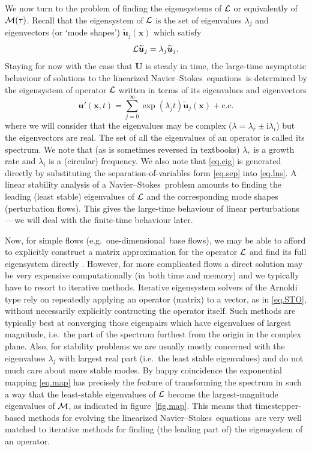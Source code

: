 \documentclass[11pt,a4paper]{report}
\newcommand\ci{\mathrm{i}}
\newcommand\wt[1]{\widetilde{#1}}
\newcommand\NavSto{Navier--Stokes}
\newcommand\LNS{linearized \NavSto}
\newcommand\LNSE{\LNS\ equations}
\newcommand\oned{one-di\-men\-sion\-al}
\newcommand{\ie}{i.e.\ }
\newcommand{\eg}{e.g.\ }
\newcommand\Ubase{{\bm{U}}}
\newcommand\upert{{\bm{u}'}}
\newcommand\xvec{\bm{x}}
\newcommand\Lop{{\cal L}}
\newcommand\Mop{{\cal M}}
\begin{document}
We now turn to the problem of finding the eigensystems of $\Lop$ or
equivalently of $\Mop(\tau)$.  Recall that the eigensystem of $\Lop$
is the set of eigenvalues $\lambda_j$ and eigenvectors (or `mode
shapes') $\wt{\bm{u}}_j(\xvec)$ which satisfy
\begin{equation}
\Lop \wt{\bm{u}}_j = \lambda_j \wt{\bm{u}}_j.
\label{eq.eig}
\end{equation}
Staying for now with the case that $\Ubase$ is steady in time, the
large-time asymptotic behaviour of solutions to the \LNSE\ is
determined by the eigensystem of operator $\Lop$ written in terms of
its eigenvalues and eigenvectors
\begin{equation}
\upert(\xvec, t) = \sum_{j=0}^\infty
\exp(\lambda_j t)\wt{\bm{u}}_j(\xvec) +\text{c.c.}
\label{eq.sep}
\end{equation}
where we will consider that the eigenvalues may be complex
($\lambda=\lambda_r\pm\ci\lambda_i$) but the eigenvectors are real. The
set of all the eigenvalues of an operator is called its spectrum. We
note that (as is sometimes reversed in textbooks) $\lambda_r$ is a
growth rate and $\lambda_i$ is a (circular) frequency.  We also note
that \eqref{eq.eig} is generated directly by substituting the
separation-of-variables form \eqref{eq.sep} into \eqref{eq.lns}. A
linear stability analysis of a \NavSto\ problem amounts to finding the
leading (least stable) eigenvalues of $\Lop$ and the corresponding
mode shapes (perturbation flows).  This gives the large-time behaviour
of linear perturbations\,---\,we will deal with the finite-time
behaviour later.

Now, for simple flows (\eg \oned\ base flows), we may be able to
afford to explicitly construct a matrix approximation for the operator
$\Lop$ and find its full eigensystem directly \citep[see \eg appendix
  A of][]{schmid01}. However, for more complicated flows a direct
solution may be very expensive computationally (in both time and
memory) and we typically have to resort to iterative methods.
Iterative eigensystem solvers of the Arnoldi type \citep{saad92} rely
on repeatedly applying an operator (matrix) to a vector, as in
\eqref{eq.STO}, without necessarily explicitly contructing the
operator itself. Such methods are typically best at converging those
eigenpairs which have eigenvalues of largest magnitude, \ie the part
of the spectrum furthest from the origin in the complex plane.  Also,
for stability problems we are usually mostly concerned with the
eigenvalues $\lambda_j$ with largest real part (\ie the least stable
eigenvalues) and do not much care about more stable modes. By happy
coincidence the exponential mapping \eqref{eq.map} has precisely the
feature of transforming the spectrum in such a way that the
least-stable eigenvalues of $\Lop$ become the largest-magnitude
eigenvalues of $\Mop$, as indicated in figure~\ref{fig.map}.  This
means that timestepper-based methods for evolving the \LNSE\ are very
well matched to iterative methods for finding (the leading part of)
the eigensystem of an operator.
\end{document}
